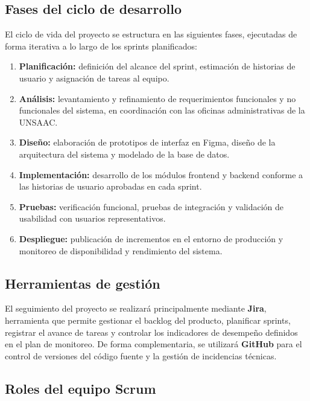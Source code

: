 \subsection{Fases del ciclo de desarrollo}

El ciclo de vida del proyecto se estructura en las siguientes fases, ejecutadas de forma
iterativa a lo largo de los sprints planificados:

\begin{enumerate}
    \item \textbf{Planificación:} definición del alcance del sprint, estimación de historias
            de usuario y asignación de tareas al equipo.
    \item \textbf{Análisis:} levantamiento y refinamiento de requerimientos funcionales y no
            funcionales del sistema, en coordinación con las oficinas administrativas de la
            UNSAAC.
    \item \textbf{Diseño:} elaboración de prototipos de interfaz en Figma, diseño de la
            arquitectura del sistema y modelado de la base de datos.
    \item \textbf{Implementación:} desarrollo de los módulos frontend y backend conforme a
            las historias de usuario aprobadas en cada sprint.
    \item \textbf{Pruebas:} verificación funcional, pruebas de integración y validación de
            usabilidad con usuarios representativos.
    \item \textbf{Despliegue:} publicación de incrementos en el entorno de producción y
            monitoreo de disponibilidad y rendimiento del sistema.
\end{enumerate}

\subsection{Herramientas de gestión}

El seguimiento del proyecto se realizará principalmente mediante \textbf{Jira}, herramienta
que permite gestionar el backlog del producto, planificar sprints, registrar el avance de
tareas y controlar los indicadores de desempeño definidos en el plan de monitoreo. De
forma complementaria, se utilizará \textbf{GitHub} para el control de versiones del código
fuente y la gestión de incidencias técnicas.

\subsection{Roles del equipo Scrum}

